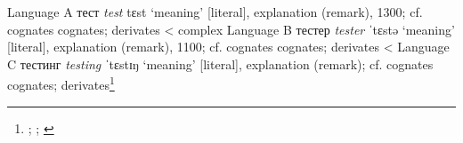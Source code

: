 \begin{etymology}\label{ety:tester}
Language A {тест} \textit{test} tɛst  `meaning' [literal], explanation (remark), 1300; cf. cognates cognates; derivates
< complex Language B {тестер} \textit{tester} ˈtɛstə  `meaning' [literal], explanation (remark), 1100; cf. cognates cognates; derivates
< Language C {тестинг} \textit{testing} ˈtɛstɪŋ  `meaning' [literal], explanation (remark); cf. cognates cognates; derivates\footnote{\textcite[test1]{oed}; \textcite[test2]{oed}; \textcite[test2]{oed}}
\end{etymology}